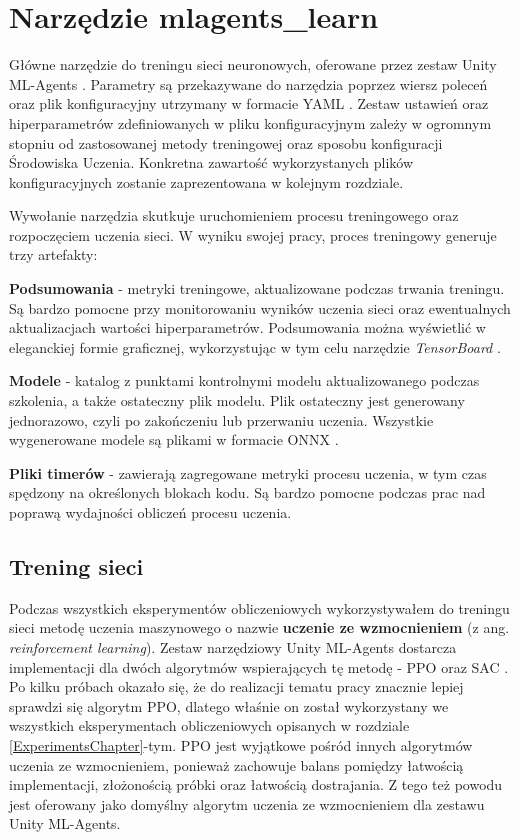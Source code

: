 \section{Narzędzie mlagents\_learn}
Główne narzędzie do treningu sieci neuronowych, oferowane przez zestaw Unity ML-Agents \cite{unitymla:trainingMlAgents}. Parametry są przekazywane do narzędzia poprzez wiersz poleceń oraz plik konfiguracyjny utrzymany w formacie YAML \cite{unitymla:configFile}. Zestaw ustawień oraz hiperparametrów zdefiniowanych w pliku konfiguracyjnym zależy w ogromnym stopniu od zastosowanej metody treningowej oraz sposobu konfiguracji Środowiska Uczenia. Konkretna zawartość wykorzystanych plików konfiguracyjnych zostanie zaprezentowana w kolejnym rozdziale.

Wywołanie narzędzia skutkuje uruchomieniem procesu treningowego oraz rozpoczęciem uczenia sieci. W wyniku swojej pracy, proces treningowy generuje trzy artefakty:
\begin{enumerate*}
\item \textbf{Podsumowania} - metryki treningowe, aktualizowane podczas trwania treningu. Są bardzo pomocne przy monitorowaniu wyników uczenia sieci oraz ewentualnych aktualizacjach wartości hiperparametrów. Podsumowania można wyświetlić w eleganckiej formie graficznej, wykorzystując w tym celu narzędzie \textit{TensorBoard} \cite{unitymla:tensorboard}.
\item \textbf{Modele} - katalog z punktami kontrolnymi modelu aktualizowanego podczas szkolenia, a także ostateczny plik modelu. Plik ostateczny jest generowany jednorazowo, czyli po zakończeniu lub przerwaniu uczenia. Wszystkie wygenerowane modele są plikami w formacie ONNX \cite{onnx:website}.
\item \textbf{Pliki timerów} - zawierają zagregowane metryki procesu uczenia, w tym czas spędzony na określonych blokach kodu. Są bardzo pomocne podczas prac nad poprawą wydajności obliczeń procesu uczenia.
\end{enumerate*}

\subsection*{Trening sieci}
Podczas wszystkich eksperymentów obliczeniowych wykorzystywałem do treningu sieci metodę uczenia maszynowego o nazwie \textbf{uczenie ze wzmocnieniem} (z ang. \textit{reinforcement learning}). Zestaw narzędziowy Unity ML-Agents dostarcza implementacji dla dwóch algorytmów wspierających tę metodę - PPO \cite{ppo:opis} oraz SAC \cite{sac:opis}. Po kilku próbach okazało się, że do realizacji tematu pracy znacznie lepiej sprawdzi się algorytm PPO, dlatego właśnie on został wykorzystany we wszystkich eksperymentach obliczeniowych opisanych w rozdziale \ref{ExperimentsChapter}-tym. PPO jest wyjątkowe pośród innych algorytmów uczenia ze wzmocnieniem, ponieważ zachowuje balans pomiędzy łatwością implementacji, złożonością próbki oraz łatwością dostrajania. Z tego też powodu jest oferowany jako domyślny algorytm uczenia ze wzmocnieniem dla zestawu Unity ML-Agents.